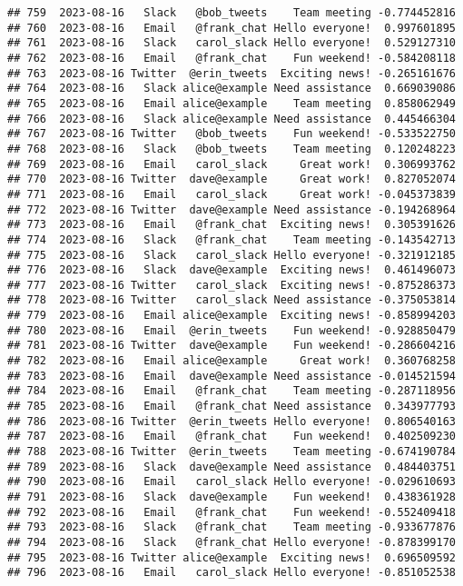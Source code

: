 \documentclass[
]{article}
\begin{document}
\begin{verbatim}
## 759  2023-08-16   Slack   @bob_tweets    Team meeting -0.774452816
## 760  2023-08-16   Email   @frank_chat Hello everyone!  0.997601895
## 761  2023-08-16   Slack   carol_slack Hello everyone!  0.529127310
## 762  2023-08-16   Email   @frank_chat    Fun weekend! -0.584208118
## 763  2023-08-16 Twitter  @erin_tweets  Exciting news! -0.265161676
## 764  2023-08-16   Slack alice@example Need assistance  0.669039086
## 765  2023-08-16   Email alice@example    Team meeting  0.858062949
## 766  2023-08-16   Slack alice@example Need assistance  0.445466304
## 767  2023-08-16 Twitter   @bob_tweets    Fun weekend! -0.533522750
## 768  2023-08-16   Slack   @bob_tweets    Team meeting  0.120248223
## 769  2023-08-16   Email   carol_slack     Great work!  0.306993762
## 770  2023-08-16 Twitter  dave@example     Great work!  0.827052074
## 771  2023-08-16   Email   carol_slack     Great work! -0.045373839
## 772  2023-08-16 Twitter  dave@example Need assistance -0.194268964
## 773  2023-08-16   Email   @frank_chat  Exciting news!  0.305391626
## 774  2023-08-16   Slack   @frank_chat    Team meeting -0.143542713
## 775  2023-08-16   Slack   carol_slack Hello everyone! -0.321912185
## 776  2023-08-16   Slack  dave@example  Exciting news!  0.461496073
## 777  2023-08-16 Twitter   carol_slack  Exciting news! -0.875286373
## 778  2023-08-16 Twitter   carol_slack Need assistance -0.375053814
## 779  2023-08-16   Email alice@example  Exciting news! -0.858994203
## 780  2023-08-16   Email  @erin_tweets    Fun weekend! -0.928850479
## 781  2023-08-16 Twitter  dave@example    Fun weekend! -0.286604216
## 782  2023-08-16   Email alice@example     Great work!  0.360768258
## 783  2023-08-16   Email  dave@example Need assistance -0.014521594
## 784  2023-08-16   Email   @frank_chat    Team meeting -0.287118956
## 785  2023-08-16   Email   @frank_chat Need assistance  0.343977793
## 786  2023-08-16 Twitter  @erin_tweets Hello everyone!  0.806540163
## 787  2023-08-16   Email   @frank_chat    Fun weekend!  0.402509230
## 788  2023-08-16 Twitter  @erin_tweets    Team meeting -0.674190784
## 789  2023-08-16   Slack  dave@example Need assistance  0.484403751
## 790  2023-08-16   Email   carol_slack Hello everyone! -0.029610693
## 791  2023-08-16   Slack  dave@example    Fun weekend!  0.438361928
## 792  2023-08-16   Email   @frank_chat    Fun weekend! -0.552409418
## 793  2023-08-16   Slack   @frank_chat    Team meeting -0.933677876
## 794  2023-08-16   Slack   @frank_chat Hello everyone! -0.878399170
## 795  2023-08-16 Twitter alice@example  Exciting news!  0.696509592
## 796  2023-08-16   Email   carol_slack Hello everyone! -0.851052538

\end{verbatim}
\end{document}
